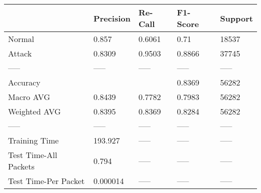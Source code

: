 \begin{tabular}{lllll}
\toprule
{} & Precision & Re-Call & F1-Score & Support \\
\midrule
Normal                &     0.857 &  0.6061 &     0.71 &   18537 \\
Attack                &    0.8309 &  0.9503 &   0.8866 &   37745 \\
-----                 &     ----- &   ----- &    ----- &   ----- \\
Accuracy              &           &         &   0.8369 &   56282 \\
Macro AVG             &    0.8439 &  0.7782 &   0.7983 &   56282 \\
Weighted AVG          &    0.8395 &  0.8369 &   0.8284 &   56282 \\
-----                 &     ----- &   ----- &    ----- &   ----- \\
Training Time         &   193.927 &   ----- &    ----- &   ----- \\
Test Time-All Packets &     0.794 &   ----- &    ----- &   ----- \\
Test Time-Per Packet  &  0.000014 &   ----- &    ----- &   ----- \\
\bottomrule
\end{tabular}
